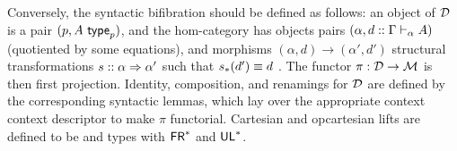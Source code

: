Conversely, the syntactic bifibration should be defined as
follows: an object of $\mathcal{D}$ is a pair $(p,A \,\, \mathsf{type}_{p})$, and the
hom-category has objects pairs $(\alpha,d :: \Gamma \vdash_{\alpha} A)$
(quotiented by some equations), and morphisms $(\alpha,d) \to (\alpha',d')$
structural transformations $s :: \alpha \Rightarrow \alpha'$ such that
$s_*(d') \equiv d$ .
The functor $\pi : \mathcal{D} \to \mathcal{M}$ is then first projection.  Identity,
composition, and renamings for $\mathcal{D}$ are defined by the corresponding
syntactic lemmas, which lay over the appropriate context context
descriptor to make $\pi$ functorial.  Cartesian and opcartesian lifts
are defined to be \Fsymb{} and \Usymb{} types with $\mathsf{FR}^*$ and $\mathsf{UL}^*$.


